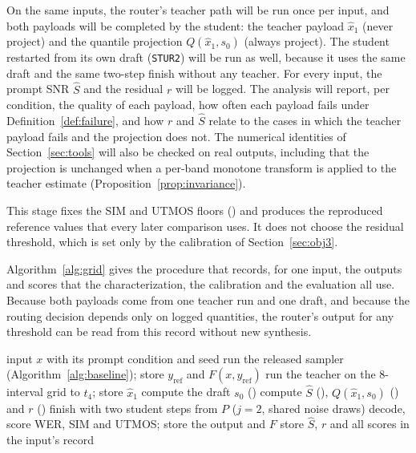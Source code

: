 On the same inputs, the router's teacher path will be run once per input, and both payloads will be completed by the student: the teacher payload $\hat x_1$ (never project) and the quantile projection $Q(\hat x_1,s_0)$ (always project). The student restarted from its own draft (\texttt{STUR2}) will be run as well, because it uses the same draft and the same two-step finish without any teacher. For every input, the prompt SNR $\hat S$ and the residual $r$ will be logged. The analysis will report, per condition, the quality of each payload, how often each payload fails under Definition~\ref{def:failure}, and how $r$ and $\hat S$ relate to the cases in which the teacher payload fails and the projection does not. The numerical identities of Section~\ref{sec:tools} will also be checked on real outputs, including that the projection is unchanged when a per-band monotone transform is applied to the teacher estimate (Proposition~\ref{prop:invariance}).

 This stage fixes the SIM and UTMOS floors () and produces the reproduced reference values that every later comparison uses. It does not choose the residual threshold, which is set only by the calibration of Section~\ref{sec:obj3}.

Algorithm~\ref{alg:grid} gives the procedure that records, for one input, the outputs and scores that the characterization, the calibration and the evaluation all use. Because both payloads come from one teacher run and one draft, and because the routing decision depends only on logged quantities, the router's output for any threshold can be read from this record without new synthesis.

\begin{algorithm}[!htbp]
\caption{Recording the outcomes of one input}
\label{alg:grid}
\small
\begin{algorithmic}[1]
\Require input $x$ with its prompt condition and seed
\State run the released sampler (Algorithm~\ref{alg:baseline}); store $y_{\text{ref}}$ and $F(x,y_{\text{ref}})$
\State run the teacher on the 8-interval grid to $t_4$; store $\hat x_1$ 
\State compute the draft $s_0$ () 
\State compute $\hat S$ (), $Q(\hat x_1,s_0)$ () and $r$ () 
  \State finish with two student steps from $P$ ($j=2$, shared noise draws) 
  \State decode, score WER, SIM and UTMOS; store the output and $F$
\EndFor
\State store $\hat S$, $r$ and all scores in the input's record
\end{algorithmic}
\end{algorithm}

